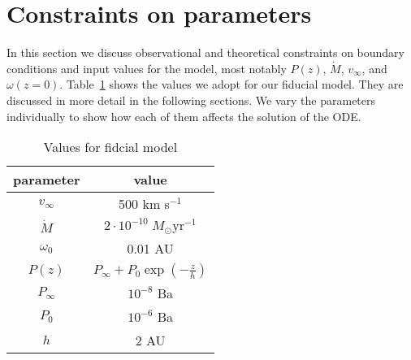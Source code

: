 \section{Constraints on parameters}
\label{sect:parameters}
In this section we discuss observational and theoretical constraints on boundary conditions and input values for the model, most notably $P(z)$, $\dot M$, $v_\infty$, and $\omega(z=0)$. Table~\ref{tab:fiducial} shows the values we adopt for our fiducial model. They are discussed in more detail in the following sections. We vary the parameters individually to show how each of them affects the solution of the ODE. 
\begin{table}
\label{tab:fiducial}
\caption{Values for fidcial model}
\begin{tabular}{cc}
\hline\hline
parameter & value\\
\hline
$v_\infty$ & 500 km s$^{-1}$\\
$\dot M$ & $2\cdot10^{-10}\;M_\odot\textrm{yr}^{-1}$\\
$\omega_0$ & 0.01 AU\\
$P(z)$ & $P_\infty+P_0\exp\left(-\frac{z}{h}\right)$\\
$P_\infty$ & $10^{-8}$ Ba\\
$P_0$ & $10^{-6}$ Ba\\
$h$ & 2 AU\\
\hline
\end{tabular}
\end{table}